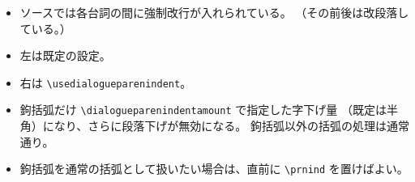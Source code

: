 \documentclass[a4paper,uplatex]{jsarticle}
\begin{document}
\begin{itemize}
\item ソースでは各台詞の間に強制改行が入れられている。
（その前後は改段落している。）
\item 左は既定の設定。
\item 右は \verb|\usedialogueparenindent|。
\item 鉤括弧だけ \verb|\dialogueparenindentamount| で指定した字下げ量
（既定は半角）になり、さらに段落下げが無効になる。
鉤括弧以外の括弧の処理は通常通り。
\item 鉤括弧を通常の括弧として扱いたい場合は、直前に \verb|\prnind|
を置けばよい。
\end{itemize}
\begin{center}
%
\hspace{4zw}
\usedialogueparenindent
{}%
\end{center}
\end{document}
